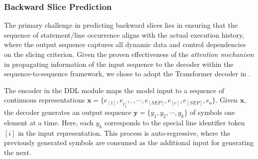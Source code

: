 \subsubsection{Backward Slice Prediction}
The primary challenge in predicting backward slices lies in ensuring that the sequence of statement/line occurrence aligns with the actual execution history, where the output sequence captures all dynamic data and control dependencies on the slicing criterion. Given the proven effectiveness of the {\em attention mechanism} in propagating information of the input sequence to the decoder within the sequence-to-sequence framework, we chose to adopt the Transformer decoder in {\tool}.

The encoder in the DDL module maps the model input to a sequence of continuous representations $\mathbf{x} = \{ e_{[1]}, e_{t_{1}^{(1)}}, \cdots, e_{[SEP]}, e_{[c]}, e_{[SEP]}, e_o \}$. Given $\mathbf{x}$, the decoder generates an output sequence $\mathbf{y} = \{y_1, y_2, \cdots, y_k\}$ of symbols one element at a time. Here, each $y_k$ corresponds to the special line identifier token $[i]$ in the input representation. This process is auto-regressive, where the previously generated symbols are consumed as the additional input for generating the next.
